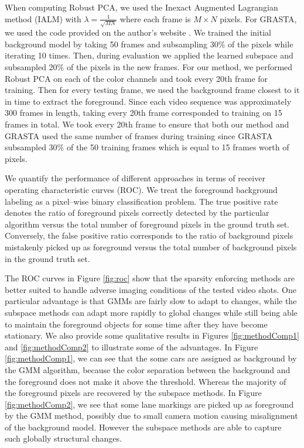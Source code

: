 \documentclass{article}
\begin{document}
When computing Robust PCA, we used the Inexact Augmented Lagrangian method (IALM) \cite{alm} \cite{rpcaCode} with $\lambda = \frac{1}{\sqrt{MN}}$ where each frame is $M\times N $ pixels. For GRASTA, we used the code provided on the author's website \cite{grastaCode}. We trained the initial background model by taking 50 frames and subsampling 30$\%$ of the pixels while iterating 10 times. Then, during evaluation we applied the learned subspace and subsampled 20$\%$ of the pixels in the new frames. For our method, we performed Robust PCA on each of the color channels and took every 20th frame for training. Then for every testing frame, we used the background frame closest to it in time to extract the foreground. Since each video sequence was approximately 300 frames in length, taking every 20th frame corresponded to training on 15 frames in total. We took every 20th frame to ensure that both our method and GRASTA used the same number of frames during training since GRASTA subsampled 30$\%$ of the 50 training frames which is equal to 15 frames worth of pixels.

We quantify the performance of different approaches in terms of receiver operating characteristic curves (ROC).  We treat the foreground background labeling as a pixel--wise binary classification problem.  The true positive rate denotes the ratio of foreground pixels correctly detected by the particular algorithm versus the total number of foreground pixels in the ground truth set.  Conversely, the false positive ratio corresponds to the ratio of background pixels mistakenly picked up as foreground versus the total number of background pixels in the ground truth set.

The ROC curves in Figure \ref{fig:roc} show that the sparsity enforcing methods are better suited to handle adverse imaging conditions of the tested video shots.  One particular advantage is that GMMs are fairly slow to adapt to changes, while the subspace methods can adapt more rapidly to global changes while still being able to maintain the foreground objects for some time after they have become stationary. We also provide some qualitative results in Figures \ref{fig:methodComp1} and \ref{fig:methodComp2} to illustrate some of the advantages.  In Figure \ref{fig:methodComp1}, we can see that the some cars are assigned as background by the GMM algorithm, because the color separation between the background and the foreground does not make it above the threshold.  Whereas the majority of the foreground pixels are recovered by the subspace methods.  In Figure \ref{fig:methodComp2}, we see that some lane markings are picked up as foreground by the GMM method, possibly due to small camera motion causing misalignment of the background model.  However the subspace methods are able to capture such globally structural changes.
\end{document}

